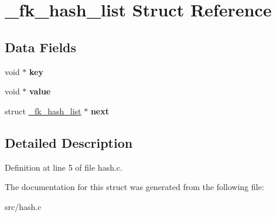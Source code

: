 \hypertarget{struct__fk__hash__list}{\section{\-\_\-fk\-\_\-hash\-\_\-list \-Struct \-Reference}
\label{struct__fk__hash__list}
}
\subsection*{\-Data \-Fields}
\begin{DoxyCompactItemize}
\item 
\hypertarget{struct__fk__hash__list_a580043f383f208acb3b7ced5add348f2}{void $\ast$ {\bfseries key}}\label{struct__fk__hash__list_a580043f383f208acb3b7ced5add348f2}

\item 
\hypertarget{struct__fk__hash__list_a7aa5c503702f8d99809b15f7ea6073d8}{void $\ast$ {\bfseries value}}\label{struct__fk__hash__list_a7aa5c503702f8d99809b15f7ea6073d8}

\item 
\hypertarget{struct__fk__hash__list_aad20a8f690f1b0084227865de10c76e1}{struct \hyperlink{struct__fk__hash__list}{\-\_\-fk\-\_\-hash\-\_\-list} $\ast$ {\bfseries next}}\label{struct__fk__hash__list_aad20a8f690f1b0084227865de10c76e1}

\end{DoxyCompactItemize}


\subsection{\-Detailed \-Description}


\-Definition at line 5 of file hash.\-c.



\-The documentation for this struct was generated from the following file\-:\begin{DoxyCompactItemize}
\item 
src/hash.\-c\end{DoxyCompactItemize}

